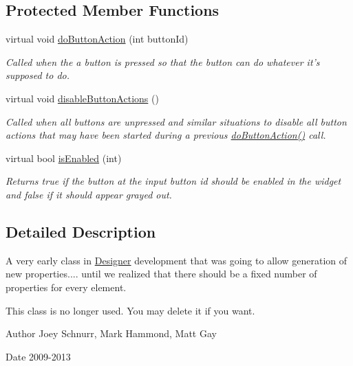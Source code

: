 \subsection*{Protected Member Functions}
\begin{DoxyCompactItemize}
\item 
\hypertarget{class_property_tool_group_ad83896033e32ef8f2aaf250301c0da55}{virtual void \hyperlink{class_property_tool_group_ad83896033e32ef8f2aaf250301c0da55}{do\-Button\-Action} (int button\-Id)}\label{class_property_tool_group_ad83896033e32ef8f2aaf250301c0da55}

\begin{DoxyCompactList}\small\item\em Called when the a button is pressed so that the button can do whatever it's supposed to do. \end{DoxyCompactList}\item 
virtual void \hyperlink{class_property_tool_group_adf0e69784e4bfd9b36a7078b9a6a09a5}{disable\-Button\-Actions} ()
\begin{DoxyCompactList}\small\item\em Called when all buttons are unpressed and similar situations to disable all button actions that may have been started during a previous \hyperlink{class_property_tool_group_ad83896033e32ef8f2aaf250301c0da55}{do\-Button\-Action()} call. \end{DoxyCompactList}\item 
virtual bool \hyperlink{class_property_tool_group_aa74eb7b67163726ba2fd3c3d8ce6f2b4}{is\-Enabled} (int)
\begin{DoxyCompactList}\small\item\em Returns true if the button at the input button id should be enabled in the widget and false if it should appear grayed out. \end{DoxyCompactList}\end{DoxyCompactItemize}


\subsection{Detailed Description}
A very early class in \hyperlink{class_designer}{Designer} development that was going to allow generation of new properties.... until we realized that there should be a fixed number of properties for every element. 

This class is no longer used. You may delete it if you want. \begin{DoxyAuthor}{Author}
Joey Schnurr, Mark Hammond, Matt Gay 
\end{DoxyAuthor}
\begin{DoxyDate}{Date}
2009-\/2013 
\end{DoxyDate}


